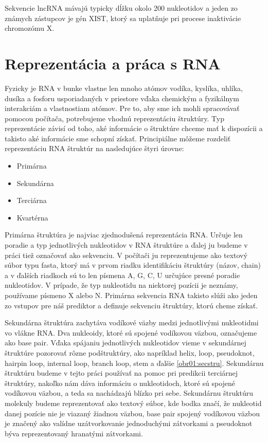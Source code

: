 \indent Sekvencie lncRNA mávajú typicky dĺžku okolo 200 nukleotidov a jeden zo známych zástupcov je gén XIST, ktorý sa uplatňuje pri procese inaktivácie chromozómu X. \cite{Rinn a Chang, 2012}


\section{Reprezentácia a práca s RNA}
Fyzicky je RNA v bunke vlastne len mnoho atómov vodíka, kyslíka, uhlíka, dusíka a fosforu usporiadaných v priestore vďaka chemickým a fyzikálnym interakciám a vlastnostiam atómov. Pre to, aby sme ich mohli spracovávať pomocou počítača, potrebujeme vhodnú reprezentáciu štruktúry.
Typ reprezentácie závisí od toho, aké informácie o štruktúre chceme mať k dispozícii a takisto aké informácie sme schopní získať. Principiálne môžeme rozdeliť reprezentáciu RNA štruktúr na nasledujúce štyri úrovne:


\begin{itemize}
\item Primárna
\item Sekundárna
\item Terciárna
\item Kvartérna
\end{itemize}


\indent Primárna štruktúra je najviac zjednodušená reprezentácia RNA. Určuje len poradie a typ jednotlivých nukleotidov v RNA štruktúre a ďalej ju budeme v práci tiež označovať ako sekvenciu. V počítači ju reprezentujeme ako textový súbor typu fasta, ktorý má v prvom riadku identifikáciu štruktúry (názov, chain) a v ďalších riadkoch sú to len písmena A, G, C, U určujúce presné poradie nukleotidov. V prípade, že typ nukleotidu na niektorej pozícii je neznámy, používame písmeno X alebo N. Primárna sekvencia RNA takisto slúži ako jeden zo vstupov pre náš prediktor a definuje sekvenciu štruktúry, ktorú cheme získať.


\indent Sekundárna štruktúra zachytáva vodíkové väzby medzi jednotlivými nukleotidmi vo vlákne RNA. Dva nukleoidy, ktoré sú spojené vodíkovou väzbou, označujeme ako base pair. Vďaka spájaniu jednotlivých nukleotidov vieme v sekundárnej štruktúre pozorovať rôzne podštruktúry, ako napríklad helix, loop, pseudoknot, hairpin loop, internal loop, branch loop, stem a ďalšie \ref{obr01:secstru}. Sekundárnu štruktúru budeme v tejto práci používať na pomoc pri predikcii terciárnej štruktúry, nakoľko nám dáva informáciu o nukleotidoch, ktoré sú spojené vodíkovou väzbou, a teda sa nachádzajú blízko pri sebe. Sekundárnu štruktúru molekuly budeme reprezentovať ako textový súbor, kde bodka značí, že nukleotid danej pozície nie je viazaný žiadnou väzbou, base pair spojený vodíkovou väzbou je značený ako valídne uzátvorkovanie jednoduchými zátvorkami a pseudoknot býva reprezentovaný hranatými zátvorkami.  


